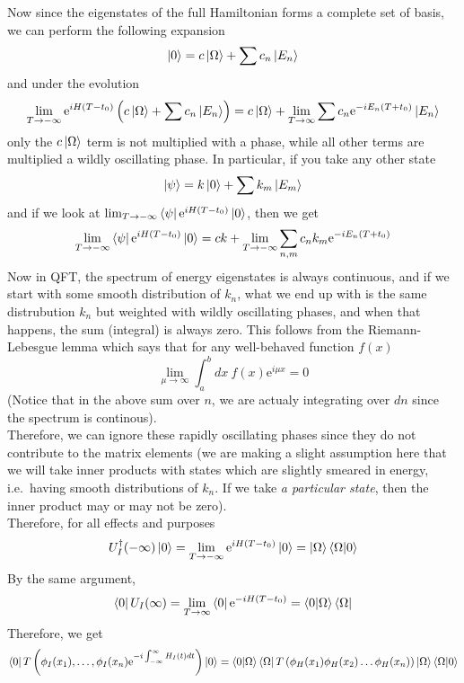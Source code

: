 \documentclass[11pt, notitlepage]{report}
\newcommand{\e}{\mathrm{e}}
\numberwithin{equation}{section}
\begin{document}
Now since the eigenstates of the full Hamiltonian forms a complete set of basis, we can perform the following expansion 
\begin{equation*}
    \ket{0} = c\ket{\Omega} + \sum c_n \ket{E_n}
\end{equation*}
and under the evolution
\begin{equation*}
    \lim_{T\to -\infty} \e^{iH(T-t_0)}\left(c\ket{\Omega} + \sum c_n \ket{E_n}\right) =c\ket{\Omega} +  \lim_{T\to \infty} \sum c_n \e^{-iE_n(T+t_0)}\ket{E_n}
\end{equation*}
only the \(c\ket{\Omega}\) term is not multiplied with a phase, while all other terms are multiplied a wildly oscillating phase. In particular, if you take any other state 
\begin{equation*}
    \ket{\psi} = k\ket{0} + \sum k_m \ket{E_m}
\end{equation*}
and if we look at \(\lim_{T\to -\infty} \bra{\psi}  \e^{iH(T-t_0)} \ket{0}\), then we get 
\begin{equation*}
    \lim_{T\to -\infty} \bra{\psi}  \e^{iH(T-t_0)} \ket{0} = ck + \lim_{T\to -\infty} \sum_{n,m}c_n k_m \e^{-iE_n(T+t_0)}
\end{equation*}
Now in QFT, the spectrum of energy eigenstates is always continuous, and if we start with some smooth distribution of \(k_n\), what we end up with is the same distrubution \(k_n\) but weighted with wildly oscillating phases, and when that happens, the sum (integral) is always zero. This follows from the Riemann-Lebesgue lemma which says that for any well-behaved function \(f(x)\) 
\begin{equation*}
    \lim_{\mu\to \infty} \int_a^b dx~f(x)\e^{i\mu x} = 0
\end{equation*}
(Notice that in the above sum over \(n\), we are actualy integrating over \(dn\) since the spectrum is continous).\\
Therefore, we can ignore these rapidly oscillating phases since they do not contribute to the matrix elements (we are making a slight assumption here that we will take inner products with states which are slightly smeared in energy, i.e.\ having smooth distributions of \(k_n\). If we take \textit{a particular state}, then the inner product may or may not be zero). \\

Therefore, for all effects and purposes 
\begin{equation*}
    U_I^\dagger (-\infty)\ket{0} = \lim_{T\to -\infty} \e^{iH(T-t_0)}\ket{0} = \ket{\Omega} \braket{\Omega|0}
\end{equation*}
By the same argument, 
\begin{equation*}
    \bra{0} U_I(\infty) = \lim_{T\to \infty} \bra{0}\e^{-iH(T-t_0)} = \braket{0|\Omega} \bra{\Omega}
\end{equation*}
Therefore, we get 
\begin{equation*}
    \bra{0} T\left( \phi_I(x_1),\ldots,\phi_I(x_n)  \e^{-i\int_{-\infty}^{\infty}H_I(t)dt}\right) \ket{0} = \braket{0|\Omega} \bra{\Omega}T\left(  \phi_H(x_1)\phi_H(x_2)\ldots\phi_H(x_n) \right)\ket{\Omega} \braket{\Omega|0}
\end{equation*}
\end{document}
